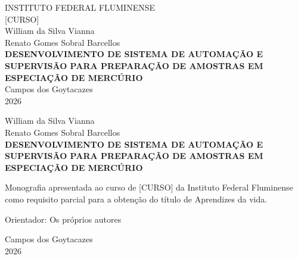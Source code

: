 \documentclass[12pt,a4paper,openright,oneside]{memoir}
\numberwithin{equation}{chapter}
\newcommand{\instituicao}{Instituto Federal Fluminense}
\newcommand{\curso}{[CURSO]}
\newcommand{\titulocurso}{Aprendizes da vida}
\newcommand{\autor}{William da Silva Vianna\\ Renato Gomes Sobral Barcellos}
\newcommand{\orientador}{Os pr\'oprios autores}
\newcommand{\cidade}{Campos dos Goytacazes}
\newcommand{\ano}{2026}
\begin{document}
\thispagestyle{empty}
\begin{center}
\MakeUppercase{\instituicao}\\[0.3cm]
\MakeUppercase{\curso}\\[4.5cm]
{\large \autor}\\[4.0cm]
{\Large \bfseries
  DESENVOLVIMENTO DE SISTEMA DE AUTOMAÇÃO E SUPERVISÃO PARA
  PREPARAÇÃO DE AMOSTRAS EM ESPECIAÇÃO DE MERCÚRIO}\\[5.5cm]
{\large \cidade}\\[0.2cm]
{\large \ano}
\end{center}
\clearpage

\thispagestyle{empty}
\begin{center}
{\large \autor}\\[5.0cm]
{\Large \bfseries
  DESENVOLVIMENTO DE SISTEMA DE AUTOMAÇÃO E SUPERVISÃO PARA
  PREPARAÇÃO DE AMOSTRAS EM ESPECIAÇÃO DE MERCÚRIO}
\end{center}
\vspace{3.0cm}
\begin{center}
\begin{minipage}[t]{9.0cm}
Monografia apresentada ao curso de \curso{} da \instituicao{}
como requisito parcial para a obtenção do título de
\titulocurso{}.
\end{minipage}
\end{center}
\vspace{1.0cm}
\begin{center}
\begin{minipage}[t]{9.0cm}
Orientador: \orientador{}
\end{minipage}
\end{center}
\vfill
\begin{center}
{\large \cidade}\\[0.2cm]
{\large \ano}
\end{center}
\clearpage

\frontmatter
\pagestyle{plain}

\end{document}
